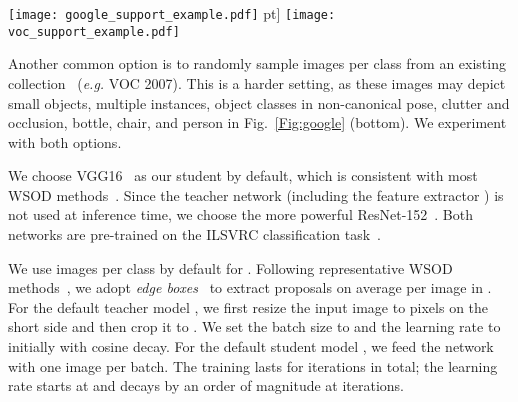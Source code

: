 \documentclass[review]{elsarticle}
\begin{document}
\begin{figure*}[t]
\centering
\texttt{[image: google\_support\_example.pdf]} \3pt]
\texttt{[image: voc\_support\_example.pdf]}
\caption{\small (Top) examples of top-ranking web images, using class names as queries. (Bottom) random selection of images from PASCAL VOC 2007.  }
\label{Fig:google}
\end{figure*}



{Another common 
option
is to randomly 
sample  images per class
from an existing collection~\cite{ShHX15,marvaniya2012drawing} (\emph{e.g.} VOC 2007). This is a harder setting,
as these images may depict small objects, multiple instances, object classes in non-canonical pose, clutter and occlusion, \eg bottle, chair, and person in Fig.~\ref{Fig:google} (bottom). }
We experiment with both options.





 We choose VGG16~\cite{vgg} as our student  by default, which is consistent with most WSOD methods~\cite{wsddn,tang2017cvpr,tang2018eccv,shen2019cvpr,tang2018pami}.
{Since the teacher network  (including the feature extractor )} is not used at inference time, we choose the more powerful ResNet-152~\cite{resnet}.
Both networks are pre-trained on the ILSVRC classification task~\cite{RDS+14}.

 We use  images per class by default for . Following representative WSOD methods~\cite{wsddn,tang2017cvpr,tang2018pami,zhang2018cvpr}, we adopt \emph{edge boxes}~\cite{edgeboxes} to extract  proposals on average per image in .
For the default teacher model , we first resize the input image to  pixels on the short side and then crop it to . We set the batch size to  and the learning rate to  initially with cosine decay. For the default student model , we feed the network with one image per batch. The training lasts for  iterations in total; the learning rate starts at  and decays by an order of magnitude at  iterations.
\end{document}
